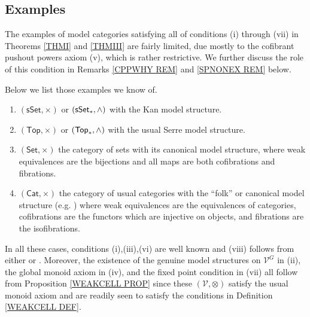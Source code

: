 \documentclass[a4paper,10pt
,draft
]{article}%
\numberwithin{equation}{section}
\numberwithin{figure}{section}
\theoremstyle{definition} %
\newcommand{\Cat}{\mathsf{Cat}}
\newcommand{\V}{\ensuremath{\mathcal V}}
\newcommand{\1}{\ensuremath{\mathbbm 1}}%
\begin{document}
\subsection{Examples}


The examples of 
model categories satisfying 
all of conditions (i) through (vii)
in Theorems \ref{THMI} and \ref{THMIII}
are fairly limited, 
due mostly to 
the cofibrant pushout powers axiom (v),
which is rather restrictive.
We further discuss the role of this condition 
in Remarks 
\ref{CPPWHY REM} and
\ref{SPNONEX REM} below.

Below we list those examples we know of.
\begin{enumerate}[label = (\alph*)]
\item $(\mathsf{sSet},\times)$ or $(\mathsf{sSet}_{\**},\wedge)$
with the Kan model structure.
\item $(\mathsf{Top},\times)$ or $(\mathsf{Top}_{\**},\wedge)$
with the usual Serre model structure.
\item $(\mathsf{Set},\times)$ the category of sets with its canonical model structure,
where weak equivalences are the bijections and all maps are both cofibrations and fibrations.
\item $(\Cat,\times)$ the category of usual categories
with the ``folk'' or canonical model structure (e.g. \cite{Rez})
where weak equivalences are the equivalences of categories,
cofibrations are the functors which are injective on objects,
and fibrations are the isofibrations.
\end{enumerate}
In all these cases, conditions (i),(iii),(vi) are well known and
(viii) follows from either 
\cite[Lemma 1.12]{BM13} or \cite[Lemma 2.1]{BM13}.
Moreover,
the existence of the genuine model structures on $\V^G$ in (ii),
the global monoid axiom in (iv),
and the fixed point condition in (vii)
all follow from Proposition \ref{WEAKCELL PROP}
since these $(\V,\otimes)$ satisfy the usual monoid axiom and
are readily seen to satisfy the conditions in Definition \ref{WEAKCELL DEF}.
\end{document}
